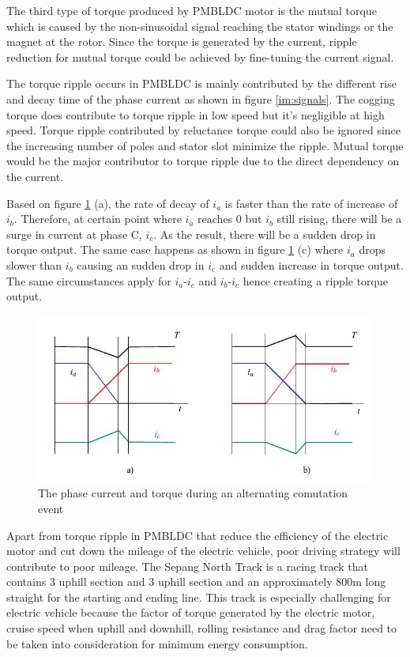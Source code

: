 The third type of torque produced by PMBLDC motor is the mutual torque which is caused by the non-sinusoidal signal reaching the stator windings or the magnet at the rotor. Since the torque is generated by the current, ripple reduction for mutual torque could be achieved by fine-tuning the current signal.

The torque ripple occurs in PMBLDC is mainly contributed by the different rise and decay time of the phase current as shown in figure \ref{im:signals}. The cogging torque does contribute to torque ripple in low speed but it's negligible at high speed. Torque ripple contributed by reluctance torque could also be ignored since the increasing number of poles and stator slot minimize the ripple. Mutual torque would be the major contributor to torque ripple due to the direct dependency on the current.

Based on figure \ref{im:comutation} (a), the rate of decay of $i_a$ is faster than the rate of increase of $i_b$. Therefore, at certain point where $i_a$ reaches 0 but $i_b$ still rising, there will be a surge in current at phase C, $i_c$. As the result, there will be a sudden drop in torque output. The same case happens as shown in figure \ref{im:comutation} (c) where $i_a$ drops slower than $i_b$ causing an sudden drop in $i_c$ and sudden increase in torque output. The same circumstances apply for $i_a$-$i_c$ and $i_b$-$i_c$ hence creating a ripple torque output. 

\begin{figure}[htb]
	\centering
	\includegraphics[width=5.5in]{images/phase_current.jpg}
	\caption{The phase current and torque during an alternating comutation event  \citep{7648}}
	\label{im:comutation}
\end{figure}

Apart from torque ripple in PMBLDC that reduce the efficiency of the electric motor and cut down the mileage of the electric vehicle, poor driving strategy will contribute to poor mileage. The Sepang North Track is a racing track that contains 3 uphill section and 3 uphill section and an approximately 800m long straight for the starting and ending line. This track is especially challenging for electric vehicle because the factor of torque generated by the electric motor, cruise speed when uphill and downhill, rolling resistance and drag factor need to be taken into consideration for minimum energy consumption.


